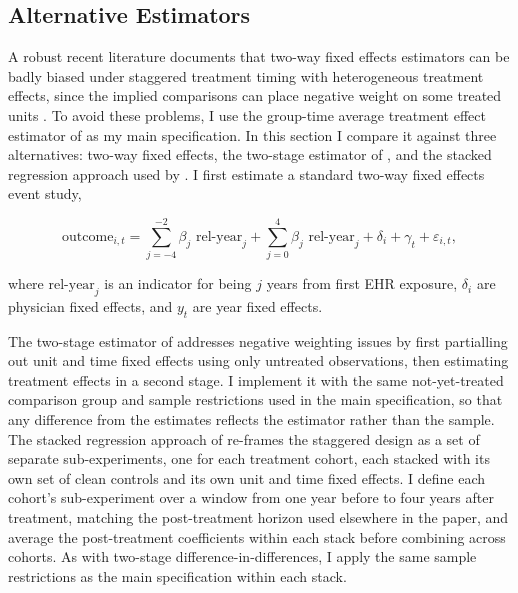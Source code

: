 \documentclass[12pt]{article}
\begin{document}


\subsection{Alternative Estimators}\label{app:estimators}

A robust recent literature documents that two-way fixed effects estimators can be badly biased under staggered treatment timing with heterogeneous treatment effects, since the implied comparisons can place negative weight on some treated units \citep[e.g.,][]{goodman2021difference, sun2021estimating}. To avoid these problems, I use the group-time average treatment effect estimator of \citet{callaway2021difference} as my main specification. In this section I compare it against three alternatives: two-way fixed effects, the two-stage estimator of \citet{gardner2021two}, and the stacked regression approach used by \citet{cengiz2019effect}.
I first estimate a standard two-way fixed effects event study,

$$\text{outcome}_{i,t} = \sum_{j=-4}^{-2} \beta_j  \text{ rel-year}_{j} + \sum_{j=0}^{4} \beta_j \text{ rel-year}_{j} + \delta_i + \gamma_t + \varepsilon_{i,t},$$

\noindent where $\text{rel-year}_j$ is an indicator for being $j$ years from first EHR exposure, $\delta_i$ are physician fixed effects, and $y_t$ are year fixed effects. 

The two-stage estimator of \citet{gardner2021two} addresses negative weighting issues by first partialling out unit and time fixed effects using only untreated observations, then estimating treatment effects in a second stage. I implement it with the same not-yet-treated comparison group and sample restrictions used in the main specification, so that any difference from the \citet{callaway2021difference} estimates reflects the estimator rather than the sample. The stacked regression approach of \citet{cengiz2019effect} re-frames the staggered design as a set of separate sub-experiments, one for each treatment cohort, each stacked with its own set of clean controls and its own unit and time fixed effects. I define each cohort's sub-experiment over a window from one year before to four years after treatment, matching the post-treatment horizon used elsewhere in the paper, and average the post-treatment coefficients within each stack before combining across cohorts. As with two-stage difference-in-differences, I apply the same sample restrictions as the main specification within each stack.
\end{document}
